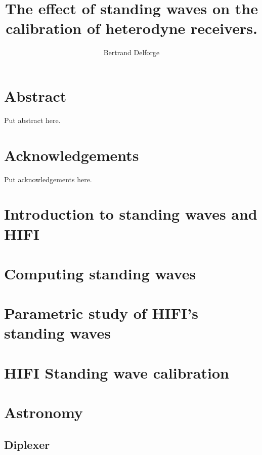 \documentclass[a4paper,11pt]{book}
\title{The effect of standing waves on the calibration of heterodyne receivers.}
\author{Bertrand Delforge}
\begin{document}
\frontmatter
\maketitle
\tableofcontents
\newpage

\listoffigures
\newpage

\clearpage
\chapter{Abstract}
Put abstract here.

\clearpage
\chapter{Acknowledgements}
Put acknowledgements here.
\mainmatter

\cleardoublepage
\chapter{Introduction to standing waves and HIFI}


\cleardoublepage
\chapter{Computing standing waves}


\cleardoublepage
\chapter{Parametric study of HIFI's standing waves}


\cleardoublepage
\chapter{HIFI Standing wave calibration}


\cleardoublepage
\chapter{Astronomy}


\begin{appendices}
\chapter{Diplexer}

\end{appendices}

\backmatter

\cleardoublepage
{}
\printindex

\cleardoublepage
{}
%
\printbibliography
\end{document}
